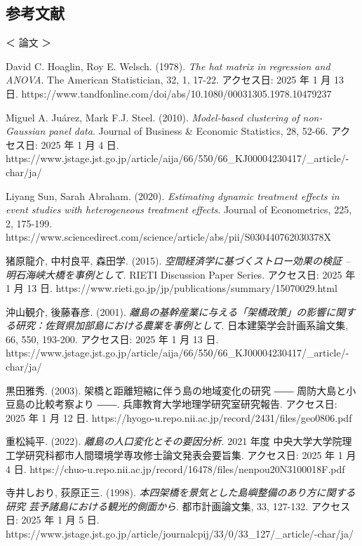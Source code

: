 \hypertarget{ux53c2ux8003ux6587ux732e}{%
\subsection{参考文献}\label{ux53c2ux8003ux6587ux732e}}

＜ 論文 ＞

David C. Hoaglin, Roy E. Welsch. (1978). \emph{The hat matrix in
regression and ANOVA}. The American Statistician, 32, 1, 17-22.
アクセス日: 2025 年 1 月 13 日.
https://www.tandfonline.com/doi/abs/10.1080/00031305.1978.10479237

Miguel A. Juárez, Mark F.J. Steel. (2010). \emph{Model-based clustering
of non-Gaussian panel data}. Journal of Business \& Economic Statistics,
28, 52-66. アクセス日: 2025 年 1 月 4 日.
https://www.jstage.jst.go.jp/article/aija/66/550/66\_KJ00004230417/\_article/-char/ja/

Liyang Sun, Sarah Abraham. (2020). \emph{Estimating dynamic treatment
effects in event studies with heterogeneous treatment effects}. Journal
of Econometrics, 225, 2, 175-199.
https://www.sciencedirect.com/science/article/abs/pii/S030440762030378X

猪原龍介, 中村良平, 森田学. (2015).
\emph{空間経済学に基づくストロー効果の検証 --明石海峡大橋を事例として}.
RIETI Discussion Paper Series. アクセス日: 2025 年 1 月 13 日.
https://www.rieti.go.jp/jp/publications/summary/15070029.html

沖山観介, 後藤春彦. (2001).
\emph{離島の基幹産業に与える「架橋政策」の影響に関する研究：佐賀県加部島における農業を事例として}.
日本建築学会計画系論文集, 66, 550, 193-200. アクセス日: 2025 年 1 月 13
日.
https://www.jstage.jst.go.jp/article/aija/66/550/66\_KJ00004230417/\_article/-char/ja/

黒田雅秀. (2003). 架橋と距離短縮に伴う島の地域変化の研究 ――
周防大島と小豆島の比較考察より ――. 兵庫教育大学地理学研究室研究報告.
アクセス日: 2025 年 1 月 12 日.
https://hyogo-u.repo.nii.ac.jp/record/2431/files/geo0806.pdf

重松純平. (2022). \emph{離島の人口変化とその要因分析}. 2021 年度
中央大学大学院理工学研究科都市人間環境学専攻修士論文発表会要旨集.
アクセス日: 2025 年 1 月 4 日.
https://chuo-u.repo.nii.ac.jp/record/16478/files/nenpou20N3100018F.pdf

寺井しおり, 荻原正三. (1998).
\emph{本四架橋を景気とした島嶼整備のあり方に関する研究
芸予諸島における観光的側面から}. 都市計画論文集, 33, 127-132.
アクセス日: 2025 年 1 月 5 日.
https://www.jstage.jst.go.jp/article/journalcpij/33/0/33\_127/\_article/-char/ja/

